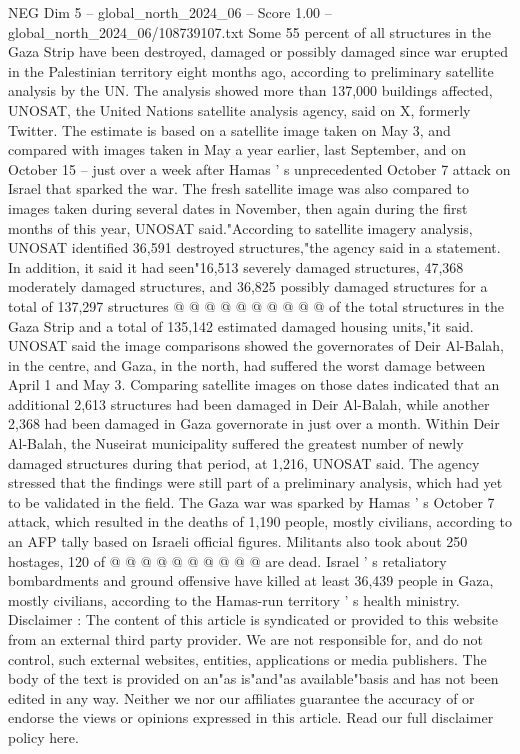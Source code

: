 \begin{textsample}{NEG Dim 5 – global\_north\_2024\_06 – Score 1.00 – global\_north\_2024\_06/108739107.txt}  \label{ex:f5_neg_139}
Some 55 percent of all structures in the Gaza Strip have been destroyed, damaged or possibly damaged since war erupted in the Palestinian territory eight months ago, according to preliminary satellite analysis by the UN.
The analysis showed more than 137,000 buildings affected, UNOSAT, the United Nations satellite analysis agency, said on X, formerly Twitter.
The estimate is based on a satellite image taken on May 3, and compared with images taken in May a year earlier, last September, and on October 15 -- just over a week after Hamas ' s unprecedented October 7 attack on Israel that sparked the war.
The fresh satellite image was also compared to images taken during several dates in November, then again during the first months of this year, UNOSAT said."According to satellite imagery analysis, UNOSAT identified 36,591 destroyed structures,"the agency said in a statement.
In addition, it said it had seen"16,513 severely damaged structures, 47,368 moderately damaged structures, and 36,825 possibly damaged structures for a total of 137,297 structures @ @ @ @ @ @ @ @ @ @ of the total structures in the Gaza Strip and a total of 135,142 estimated damaged housing units,"it said.
UNOSAT said the image comparisons showed the governorates of Deir Al-Balah, in the centre, and Gaza, in the north, had suffered the worst damage between April 1 and May 3.
Comparing satellite images on those dates indicated that an additional 2,613 structures had been damaged in Deir Al-Balah, while another 2,368 had been damaged in Gaza governorate in just over a month.
Within Deir Al-Balah, the Nuseirat municipality suffered the greatest number of newly damaged structures during that period, at 1,216, UNOSAT said.
The agency stressed that the findings were still part of a preliminary analysis, which had yet to be validated in the field.
The Gaza war was sparked by Hamas ' s October 7 attack, which resulted in the deaths of 1,190 people, mostly civilians, according to an AFP tally based on Israeli official figures.
Militants also took about 250 hostages, 120 of @ @ @ @ @ @ @ @ @ @ are dead.
Israel ' s retaliatory bombardments and ground offensive have killed at least 36,439 people in Gaza, mostly civilians, according to the Hamas-run territory ' s health ministry.
Disclaimer : The content of this article is syndicated or provided to this website from an external third party provider.
We are not responsible for, and do not control, such external websites, entities, applications or media publishers.
The body of the text is provided on an"as is"and"as available"basis and has not been edited in any way.
Neither we nor our affiliates guarantee the accuracy of or endorse the views or opinions expressed in this article.
Read our full disclaimer policy here.

\end{textsample}
